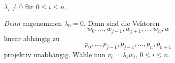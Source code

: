 \begin{behauptung*}
  \( \lambda_i\neq 0 \) für \( 0\leq i\leq n \).
\end{behauptung*}
\emph{Denn} angenommen \( \lambda_0=0 \). Dann sind die Vektoren
\begin{equation*}
  w_0,\dotsc,w_{j-1},w_{j+1},\dotsc,w_n,w
\end{equation*}
linear abhängig \contra zu 
\begin{equation*}
  p_0,\dotsc,p_{j-1},p_{j+1},\dotsc,p_n,p_{n+1}
\end{equation*}
projektiv unabhängig. Wähle nun \( v_i=\lambda_i w_i \), \( 0\leq i\leq n \).